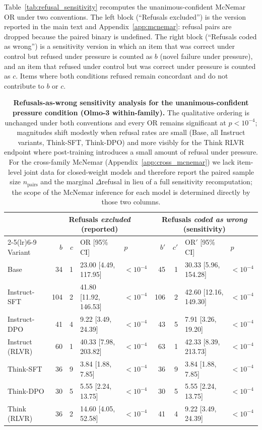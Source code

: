 \documentclass{article}
\begin{document}
Table~\ref{tab:refusal_sensitivity} recomputes the unanimous-confident McNemar OR under two conventions. The left block (``Refusals excluded'') is the version reported in the main text and Appendix~\ref{app:mcnemar}: refusal pairs are dropped because the paired binary is undefined. The right block (``Refusals coded as wrong'') is a sensitivity version in which an item that was correct under control but refused under pressure is counted as $b$ (novel failure under pressure), and an item that refused under control but was correct under pressure is counted as $c$. Items where both conditions refused remain concordant and do not contribute to $b$ or $c$.

\begin{table}[H]
    \centering
    \footnotesize
    \setlength{\tabcolsep}{4pt}
    \renewcommand{\arraystretch}{1.0}
    \begin{tabular}{l rr ll rr ll}
        \toprule
         & \multicolumn{4}{c}{Refusals \emph{excluded} (reported)} & \multicolumn{4}{c}{Refusals \emph{coded as wrong} (sensitivity)} \\
        \cmidrule(lr){2-5}\cmidrule(lr){6-9}
        Variant & $b$ & $c$ & OR [95\% CI] & $p$ & $b'$ & $c'$ & OR$'$ [95\% CI] & $p$ \\
        \midrule
        Base & 34 & 1 & 23.00 [4.49, 117.95] & $<10^{-4}$ & 45 & 1 & 30.33 [5.96, 154.28] & $<10^{-4}$ \\
        Instruct-SFT & 104 & 2 & 41.80 [11.92, 146.53] & $<10^{-4}$ & 106 & 2 & 42.60 [12.16, 149.30] & $<10^{-4}$ \\
        Instruct-DPO & 41 & 4 & 9.22 [3.49, 24.39] & $<10^{-4}$ & 43 & 5 & 7.91 [3.26, 19.20] & $<10^{-4}$ \\
        Instruct (RLVR) & 60 & 1 & 40.33 [7.98, 203.82] & $<10^{-4}$ & 63 & 1 & 42.33 [8.39, 213.73] & $<10^{-4}$ \\
        Think-SFT & 36 & 9 & 3.84 [1.88, 7.85] & $<10^{-4}$ & 36 & 9 & 3.84 [1.88, 7.85] & $<10^{-4}$ \\
        Think-DPO & 30 & 5 & 5.55 [2.24, 13.75] & $<10^{-4}$ & 30 & 5 & 5.55 [2.24, 13.75] & $<10^{-4}$ \\
        Think (RLVR) & 36 & 2 & 14.60 [4.05, 52.58] & $<10^{-4}$ & 41 & 4 & 9.22 [3.49, 24.39] & $<10^{-4}$ \\
        \bottomrule
    \end{tabular}
    \caption{\textbf{Refusals-as-wrong sensitivity analysis for the unanimous-confident pressure condition (Olmo-3 within-family).} The qualitative ordering is unchanged under both conventions and every OR remains significant at $p < 10^{-4}$; magnitudes shift modestly when refusal rates are small (Base, all Instruct variants, Think-SFT, Think-DPO) and more visibly for the Think RLVR endpoint where post-training introduces a small amount of refusal under pressure. For the cross-family McNemar (Appendix~\ref{app:cross_mcnemar}) we lack item-level joint data for closed-weight models and therefore report the paired sample size $n_{\text{pairs}}$ and the marginal $\Delta$refusal in lieu of a full sensitivity recomputation; the scope of the McNemar inference for each model is determined directly by those two columns.}

\end{table}
\end{document}
